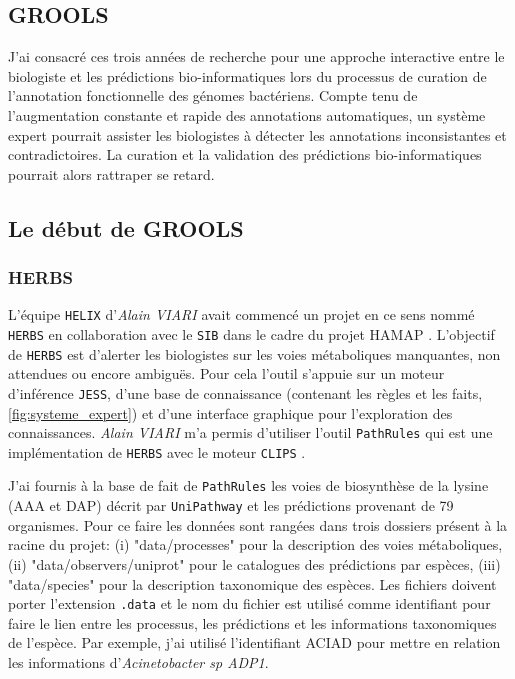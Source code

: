 \begin{refsegment}
\chapter{GROOLS}

J'ai consacré ces trois années de recherche pour une approche interactive entre le biologiste et les prédictions bio-informatiques lors du processus de curation de l'annotation fonctionnelle des génomes bactériens. Compte tenu de l'augmentation constante et rapide des annotations automatiques, un système expert pourrait assister les biologistes à détecter les annotations inconsistantes et contradictoires. La curation et la validation des prédictions bio-informatiques pourrait alors rattraper se retard.

\section{Le début de GROOLS}

\subsection{HERBS}

L'équipe \texttt{HELIX} d'\textit{Alain VIARI} avait commencé un projet en ce sens nommé \texttt{\gls{HERBS}} en collaboration avec le \texttt{\gls{SIB}} dans le cadre du projet \gls{HAMAP} \cite{pedruzzi2015hamap}. L'objectif de \texttt{\gls{HERBS}} est d'alerter les biologistes sur les voies métaboliques manquantes, non attendues ou encore ambiguës. Pour cela l'outil s'appuie sur un moteur d'inférence \texttt{\gls{JESS}}, d'une base de connaissance (contenant les règles et les faits, \cref{fig:systeme_expert}) et d'une interface graphique pour l'exploration des connaissances. \textit{Alain VIARI} m'a permis d'utiliser l'outil \texttt{PathRules} qui est une implémentation de \texttt{\gls{HERBS}} avec le moteur \texttt{\gls{CLIPS}} \cite{riley1991clips}.


J'ai fournis à la base de fait de  \texttt{PathRules} les voies de biosynthèse de la lysine (AAA et DAP) décrit par \texttt{UniPathway} et les prédictions provenant de 79 organismes. Pour ce faire les données sont rangées dans trois dossiers présent à la racine du projet: (i) "data/processes" pour la description des voies métaboliques, (ii) "data/observers/uniprot" pour le catalogues des prédictions par espèces, (iii) "data/species" pour la description taxonomique des espèces. Les fichiers doivent porter l'extension \texttt{.data} et le nom du fichier est utilisé comme identifiant pour faire le lien entre les processus, les prédictions et les informations taxonomiques de l'espèce. Par exemple, j'ai utilisé l'identifiant ACIAD pour mettre en relation les informations d'\textit{Acinetobacter sp ADP1}.


\end{refsegment}
